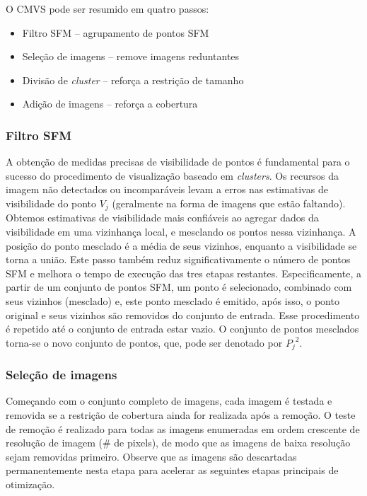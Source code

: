 \begin{itemize}
O CMVS pode ser resumido em quatro passos:

\begin{itemize}
\item Filtro SFM -- agrupamento de pontos SFM
\item Seleção de imagens -- remove imagens reduntantes
\item Divisão de \emph{cluster} -- reforça a restrição de tamanho
\item Adição de imagens -- reforça a cobertura
\end{itemize}

\subsubsection{Filtro SFM}
A obtenção de medidas precisas de visibilidade de pontos é fundamental para o sucesso do procedimento de visualização baseado em \emph{clusters}. Os recursos da imagem não detectados ou incomparáveis levam a erros nas estimativas de visibilidade do ponto $V_j$ (geralmente na forma de imagens que estão faltando). Obtemos estimativas de visibilidade mais confiáveis ao agregar dados da visibilidade em uma vizinhança local, e mesclando os pontos nessa vizinhança. A posição do ponto mesclado é a média de seus vizinhos, enquanto a visibilidade se torna a união. Este passo também reduz significativamente o número de pontos SFM e melhora o tempo de execução das tres etapas restantes. Especificamente, a partir de um conjunto de pontos SFM, um ponto é selecionado, combinado com seus vizinhos (mesclado) e, este ponto mesclado é emitido, após isso, o ponto original e seus vizinhos são removidos do conjunto de entrada. Esse procedimento é repetido até o conjunto de entrada estar vazio. O conjunto de pontos mesclados torna-se o novo conjunto de pontos, que, pode ser denotado por ${P_j}^2$. %

\subsubsection{Seleção de imagens}
Começando com o conjunto completo de imagens, cada imagem é testada e removida se a restrição de cobertura ainda for realizada após a remoção. O teste de remoção é realizado para todas as imagens enumeradas em ordem crescente de resolução de imagem (\# de pixels), de modo que as imagens de baixa resolução sejam removidas primeiro. Observe que as imagens são descartadas permanentemente nesta etapa para acelerar as seguintes etapas principais de otimização.


\end{itemize}
